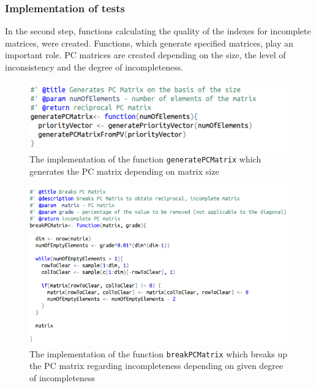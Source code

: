 \newpage
\subsubsection{Implementation of tests}
In the second step, functions calculating the quality of the indexes for incomplete matrices, were created. Functions, which generate specified matrices, play an important role. PC matrices are created depending on the size, the level of inconsistency and the degree of incompleteness.

\begin{figure}[h]
\centerline{\includegraphics[scale=0.75]{images/kod11.png}}
\caption{The implementation of the function \texttt{generatePCMatrix} which generates the PC matrix depending on matrix size}
\end{figure}

\begin{figure}[h]
\centerline{\includegraphics[scale=0.73]{images/kod13.png}}
\caption{The implementation of the function \texttt{breakPCMatrix} which breaks up the PC matrix regarding incompleteness depending on given degree of incompleteness}

\end{figure}


